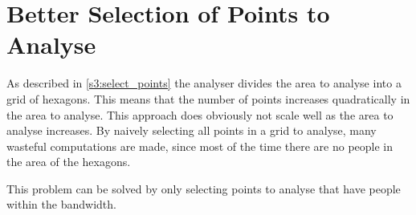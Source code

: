 \section{Better Selection of Points to Analyse}
As described in \cref{s3:select_points} the analyser divides the area to analyse into a grid of hexagons. This means that the number of points increases quadratically in the area to analyse.  This approach does obviously not scale well as the area to analyse increases. By naively selecting all points in a grid to analyse, many wasteful computations are made, since most of the time there are no people in the area of the hexagons.

This problem can be solved by only selecting points to analyse that have people within the bandwidth.
